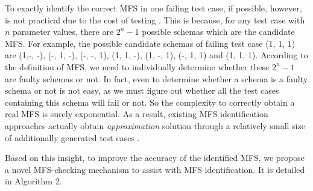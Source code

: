 \documentclass[journal,12pt,onecolumn,draftclsnofoot,]{IEEEtran}
\begin{document}

To exactly identify the correct MFS in one failing test case, if possible, however, is not practical due to the cost of testing \cite{nie2011minimal,colbourn2008locating}. This is because, for any test case with $n$ parameter values, there are $2^{n} - 1$ possible schemas which are the candidate MFS. For example, the possible candidate schemas of failing test case (1, 1, 1) are  (1,-, -), (-, 1, -), (-, -, 1), (1, 1, -), (1, -, 1), (-, 1, 1) and (1, 1, 1). According to the definition of MFS, we need to individually determine whether these $2^{n} - 1$ are faulty schemas or not. In fact, even to determine whether a schema is a faulty schema or not is not easy, as we must figure out whether all the test cases containing this schema will fail or not. So the complexity to correctly obtain a real MFS is surely exponential. As a result, existing MFS identification approaches actually obtain \emph{approximation} solution through a relatively small size of additionally generated test cases \cite{nie2011minimal,niu2013identifying,zhang2011characterizing,colbourn2008locating,li2012improved,martinez2008algorithms,ghandehari2012identifying}.

Based on this insight, to improve the accuracy of the identified MFS, we propose a novel MFS-checking mechanism to assist with MFS identification. It is detailed in Algorithm 2.
\end{document}
